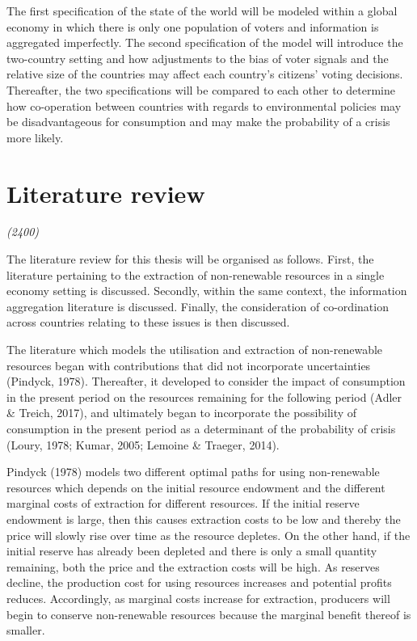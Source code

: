 \documentclass[11pt,preprint, authoryear]{elsarticle}
\numberwithin{equation}{section}
\numberwithin{figure}{section}
\numberwithin{table}{section}
\begin{document}
The first specification of the state of the world will be modeled within
a global economy in which there is only one population of voters and
information is aggregated imperfectly. The second specification of the
model will introduce the two-country setting and how adjustments to the
bias of voter signals and the relative size of the countries may affect
each country's citizens' voting decisions. Thereafter, the two
specifications will be compared to each other to determine how
co-operation between countries with regards to environmental policies
may be disadvantageous for consumption and may make the probability of a
crisis more likely.

\hypertarget{literature-review}{%
\section{Literature review}\label{literature-review}}

\emph{(2400)}

The literature review for this thesis will be organised as follows.
First, the literature pertaining to the extraction of non-renewable
resources in a single economy setting is discussed. Secondly, within the
same context, the information aggregation literature is discussed.
Finally, the consideration of co-ordination across countries relating to
these issues is then discussed.

The literature which models the utilisation and extraction of
non-renewable resources began with contributions that did not
incorporate uncertainties (Pindyck, 1978). Thereafter, it developed to
consider the impact of consumption in the present period on the
resources remaining for the following period (Adler \& Treich, 2017),
and ultimately began to incorporate the possibility of consumption in
the present period as a determinant of the probability of crisis (Loury,
1978; Kumar, 2005; Lemoine \& Traeger, 2014).

Pindyck (1978) models two different optimal paths for using
non-renewable resources which depends on the initial resource endowment
and the different marginal costs of extraction for different resources.
If the initial reserve endowment is large, then this causes extraction
costs to be low and thereby the price will slowly rise over time as the
resource depletes. On the other hand, if the initial reserve has already
been depleted and there is only a small quantity remaining, both the
price and the extraction costs will be high. As reserves decline, the
production cost for using resources increases and potential profits
reduces. Accordingly, as marginal costs increase for extraction,
producers will begin to conserve non-renewable resources because the
marginal benefit thereof is smaller.
\end{document}

